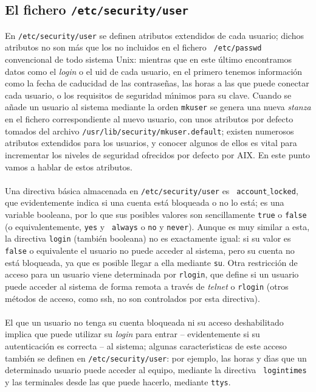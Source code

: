 \subsection{El fichero {\tt /etc/security/user}}
En {\tt /etc/security/user} se definen atributos extendidos de cada usuario; 
dichos atributos no son m\'as que los no incluidos en el fichero {\tt 
/etc/passwd} convencional de todo sistema Unix: mientras que en este \'ultimo
encontramos datos como el {\it login} o el {\sc uid} de cada usuario, en el
primero tenemos informaci\'on como la fecha de caducidad de las contrase\~nas,
las horas a las que puede conectar cada usuario, o los requisitos de seguridad
m\'{\i}nimos para su clave. Cuando se a\~nade un usuario al sistema mediante 
la orden {\tt mkuser} se genera una nueva {\it stanza} en el fichero
correspondiente al nuevo usuario, con unos atributos por defecto tomados del
archivo {\tt /usr/lib/security/mkuser.default}; existen numerosos atributos 
extendidos para los usuarios, y conocer algunos de ellos es vital para 
incrementar los niveles de seguridad ofrecidos por defecto por AIX. En este 
punto vamos a hablar de estos atributos.\\
\\Una directiva b\'asica almacenada en {\tt /etc/security/user} es {\tt
account$\_$locked}, que evidentemente indica si una cuenta est\'a bloqueada o
no lo est\'a; es una variable booleana, por lo que sus posibles valores son 
sencillamente {\tt true} o {\tt false} (o equivalentemente, {\tt yes} y {\tt
always} o {\tt no} y {\tt never}). Aunque es muy similar a esta, la directiva
{\tt login} (tambi\'en booleana) no es exactamente igual: si su valor es {\tt
false} o equivalente el usuario no puede acceder al sistema, pero su cuenta no
est\'a bloqueada, ya que es posible llegar a ella mediante {\tt su}. Otra 
restricci\'on de acceso para un usuario viene determinada por {\tt rlogin}, que
define si un usuario puede acceder al sistema de forma remota a trav\'es de {\it
telnet} o {\tt rlogin} (otros m\'etodos de acceso, como {\sc ssh}, no son 
controlados por esta directiva).\\
\\El que un usuario no tenga su cuenta bloqueada ni su acceso deshabilitado 
implica que puede utilizar su
{\it login} para entrar -- evidentemente si su autenticaci\'on es correcta -- 
al sistema; algunas caracter\'{\i}sticas de este acceso tambi\'en se definen
en {\tt /etc/security/user}: por ejemplo, las horas y d\'{\i}as que un 
determinado usuario puede acceder al equipo, mediante la directiva {\tt 
logintimes} y las terminales desde las que puede hacerlo, mediante {\tt ttys}.
